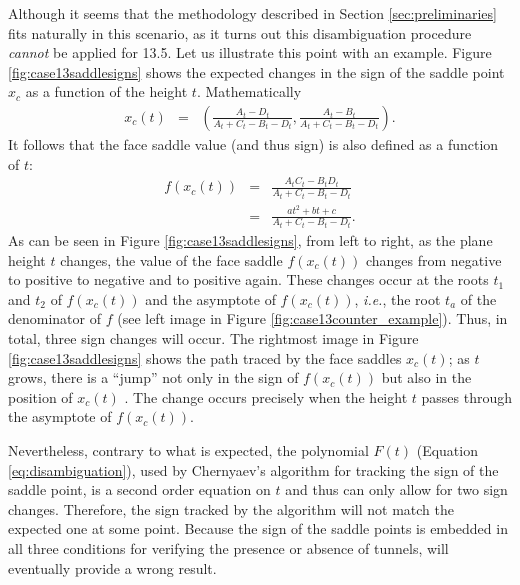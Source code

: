 Although it seems that the \mc{} methodology described in Section \ref{sec:preliminaries} fits naturally in this scenario, as it turns out this disambiguation procedure \emph{cannot} be applied for 13.5. %
%
Let us illustrate this point with an example. Figure \ref{fig:case13saddlesigns} shows the expected changes in the sign of the saddle point $x_c$ as a function of the height $t$. Mathematically
\begin{eqnarray}
x_c(t) & = & \left( \frac{A_t - D_t}{A_t+C_t-B_t-D_t}, \frac{A_t - B_t}{A_t+C_t-B_t-D_t} \right).
\end{eqnarray}
It follows that the face saddle value (and thus sign) is also defined as a function of $t$:
\begin{eqnarray}
f(x_c(t)) &=& \frac{A_tC_t - B_tD_t}{A_t+C_t-B_t-D_t}\\
       &=& \frac{a t^2 + b t + c}{A_t+C_t-B_t-D_t}.
\end{eqnarray}
As can be seen in Figure \ref{fig:case13saddlesigns}, from left to right, as the plane height $t$ changes, the value of the face saddle $f(x_c(t))$ changes from negative to positive to negative and to positive again. These changes occur at the roots $t_1$ and $t_2$ of $f(x_c(t))$ and the asymptote of $f(x_c(t))$, {\em i.e.}, the root $t_{a}$ of the denominator of $f$ (see left image in Figure \ref{fig:case13counter_example}). Thus, in total, three sign changes will occur. The rightmost image in Figure \ref{fig:case13saddlesigns} shows the path traced by the face saddles $x_c(t)$; as $t$ grows, there is a ``jump'' not only in the sign of $f(x_c(t))$ but also in the position of $x_c(t)$ . The change occurs precisely when the height $t$ passes through the asymptote of $f(x_c(t))$.

Nevertheless, contrary to what is expected, the polynomial $F(t)$ (Equation \eqref{eq:disambiguation}), used by Chernyaev's \mc{} algorithm for tracking the sign of the saddle point, is a second order equation on $t$ and thus can only allow for two sign changes. Therefore, the sign tracked by the \mc{} algorithm will not match the expected one at some point. Because the sign of the saddle points is embedded in all three  conditions for verifying the presence or absence of tunnels, \mc{} will eventually provide a wrong result.

